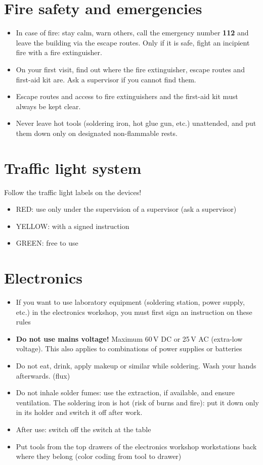 \documentclass[13pt]{\basedir/fablab-document}
\begin{document}
\section{Fire safety and emergencies}
\begin{itemize}
  \item In case of fire: stay calm, warn others, call the emergency number \textbf{112} and leave the building via the escape routes. Only if it is safe, fight an incipient fire with a fire extinguisher.
  \item On your first visit, find out where the fire extinguisher, escape routes and first-aid kit are. Ask a supervisor if you cannot find them.
  \item Escape routes and access to fire extinguishers and the first-aid kit must always be kept clear.
  \item Never leave hot tools (soldering iron, hot glue gun, etc.) unattended, and put them down only on designated non-flammable rests.
\end{itemize}

\vbox{\vspace{0,5cm}}

\section{Traffic light system}
Follow the traffic light labels on the devices!
\begin{itemize}
 \item RED: use only under the supervision of a supervisor (ask a supervisor)
 \item YELLOW: with a signed instruction
 \item GREEN: free to use
\end{itemize}

\vbox{\vspace{0,5cm}}

\section{Electronics}
\begin{itemize}
  \item If you want to use laboratory equipment (soldering station, power supply, etc.) in the electronics workshop, you must first sign an instruction on these rules
  \item \textbf{Do not use mains voltage!} Maximum 60\,V DC or 25\,V AC (extra-low voltage). This also applies to combinations of power supplies or batteries
 \item Do not eat, drink, apply makeup or similar while soldering. Wash your hands afterwards. (flux)
 \item Do not inhale solder fumes: use the extraction, if available, and ensure ventilation. The soldering iron is hot (risk of burns and fire): put it down only in its holder and switch it off after work.
 \item After use: switch off the switch at the table
 \item Put tools from the top drawers of the electronics workshop workstations back where they belong (color coding from tool to drawer)
\end{itemize}
\end{document}
